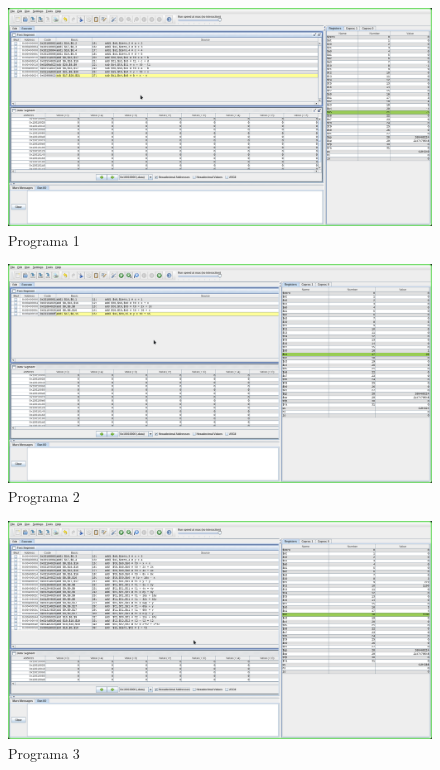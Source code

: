 \documentclass[a4paper,11pt]{article}
\begin{document}
\begin{figure}[!ht]
    \caption{Programa 1}
    \centering
    \includegraphics[width=1\textwidth]{programa1}
\end{figure}
\begin{figure}[!ht]
    \caption{Programa 2}
    \centering
    \includegraphics[width=1\textwidth]{programa2}
\end{figure}
\begin{figure}[!ht]
    \caption{Programa 3}
    \centering
    \includegraphics[width=1\textwidth]{programa3}
\end{figure} 
\end{document}
